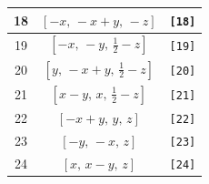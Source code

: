 \documentclass[fleqn,8pt]{jsarticle}
\begin{document}
\begin{longtable}{ccc}
18 & $\left[ - x,\, - x + y,\, - z \right]$ & {\tt [18]} \\ \hline
19 & $\left[ - x,\, - y,\, \frac{1}{2} - z \right]$ & {\tt [19]} \\ \hline
20 & $\left[ y,\, - x + y,\, \frac{1}{2} - z \right]$ & {\tt [20]} \\ \hline
21 & $\left[ x - y,\, x,\, \frac{1}{2} - z \right]$ & {\tt [21]} \\ \hline
22 & $\left[ - x + y,\, y,\, z \right]$ & {\tt [22]} \\ \hline
23 & $\left[ - y,\, - x,\, z \right]$ & {\tt [23]} \\ \hline
24 & $\left[ x,\, x - y,\, z \right]$ & {\tt [24]} \\
\end{longtable}
\end{document}
